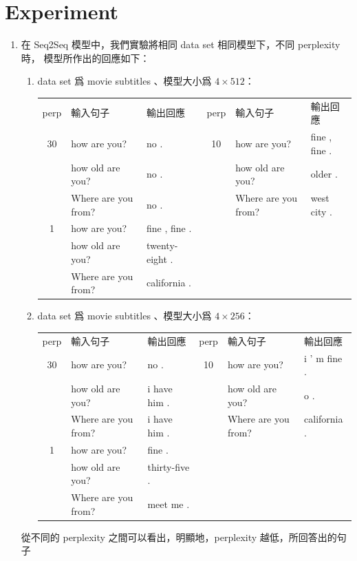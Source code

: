 \documentclass[12pt, a4paper]{article}
\theoremstyle{mystyle}	%
\begin{document}
\section{Experiment}
\begin{enumerate}
\item 在 Seq2Seq 模型中，我們實驗將相同 data set 相同模型下，不同 perplexity 時，
  模型所作出的回應如下：
  \begin{enumerate}
  \item data set 爲 movie subtitles 、模型大小爲 $4 \times 512$：\\
    \begin{tabular}{cllcll}
      perp   & 輸入句子 & 輸出回應     & perp   & 輸入句子 & 輸出回應 \\
      30  & how are you?      & no .   &    10  & how are you?      & fine , fine . \\ 
          & how old are you?  & no .   &        & how old are you?  & older . \\       
          & Where are you from? & no . &        & Where are you from? & west city . \\   
      1   & how are you?      & fine , fine . \\
          & how old are you?  & twenty-eight . \\
          & Where are you from? & california . \\
    \end{tabular}
  \item data set 爲 movie subtitles 、模型大小爲 $4 \times 256$：\\
    \begin{tabular}{cllcll}
      perp   & 輸入句子 & 輸出回應       & perp   & 輸入句子 & 輸出回應 \\
      30  & how are you?      & no .           &  10  & how are you?      & i ' m fine . \\   
          & how old are you?  & i have him .   &      & how old are you?  & o . \\            
          & Where are you from? & i have him . &      & Where are you from? & california . \\ 
      1   & how are you?      & fine . \\
          & how old are you?  & thirty-five . \\
          & Where are you from? & meet me .  \\
    \end{tabular}
  \end{enumerate}
  從不同的 perplexity 之間可以看出，明顯地，perplexity 越低，所回答出的句子

\end{enumerate}
\end{document}
